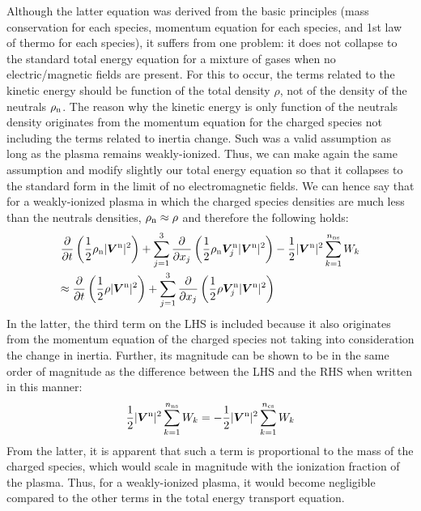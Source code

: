 \documentclass{warpdoc}
\newcommand{\alb}{\vspace{0.1cm}\\} %
\newcommand{\mfd}{\displaystyle}
\newcommand{\nns}{{n_{\rm ns}}}
\newcommand{\ncs}{{n_{\rm cs}}}
\renewcommand{\vec}[1]{\bm{#1}}
\begin{document}
Although the latter equation was derived from the basic principles (mass conservation for each species, momentum equation for each species, and 1st law of thermo for each species), it suffers from one problem: it does not collapse to the standard total energy equation for a mixture of gases when no electric/magnetic fields are present. For this to occur, the terms related to the kinetic energy should be function of the total density $\rho$, not of the density of the neutrals $\rho_{\rm n}$. The reason why the kinetic energy is only function of the neutrals density originates from the momentum equation for the charged species not including the terms related to inertia change. Such was a valid assumption as long as the plasma remains weakly-ionized. Thus, we can make again the same assumption and modify slightly our total energy equation so that it collapses to the standard form in the limit of no electromagnetic fields. We can hence say that for a weakly-ionized plasma in which the charged species densities are much less than the neutrals densities, $\rho_{\rm n}\approx \rho$ and therefore the following holds:
%
\begin{equation}
\begin{array}{l}\mfd
\frac{\partial }{\partial t} \left(\frac{1}{2}\rho_{\rm n}|\vec{V}^{\rm n}|^2\right)
+ \sum_{j=1}^3  \frac{\partial }{\partial x_j} \left(
\frac{1}{2}\rho_{\rm n}\vec{V}^{\rm n}_j|\vec{V}^{\rm n}|^2
\right)
-\frac{1}{2}|\vec{V}^{\rm n}|^2 \sum_{k=1}^\nns W_k\alb\mfd
\approx
\frac{\partial }{\partial t} \left(\frac{1}{2}\rho |\vec{V}^{\rm n}|^2\right)
+ \sum_{j=1}^3  \frac{\partial }{\partial x_j} \left(
\frac{1}{2}\rho \vec{V}^{\rm n}_j|\vec{V}^{\rm n}|^2
\right)
\end{array}
\label{eqn:etotal2}
\end{equation}
%
In the latter, the third term on the LHS is included because it also originates from the momentum equation of the charged species not taking into consideration the change in inertia. Further, its magnitude can be shown to be in the same order of magnitude as the difference between the LHS and the RHS when written in this manner:
%
\begin{equation}
\frac{1}{2}|\vec{V}^{\rm n}|^2 \sum_{k=1}^\nns W_k =
-\frac{1}{2}|\vec{V}^{\rm n}|^2 \sum_{k=1}^\ncs W_k
\end{equation}
%   
From the latter, it is apparent that such a term is proportional to the mass of the charged species, which would scale in magnitude with the ionization fraction of the plasma. Thus, for a weakly-ionized plasma, it would become negligible compared to the other terms in the total energy transport equation. 
\end{document}
